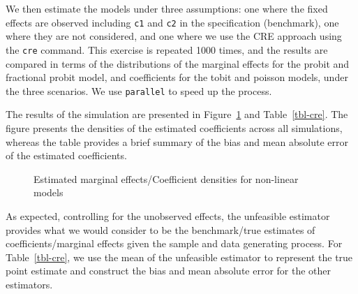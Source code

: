 \documentclass[bib]{statapress}
\begin{document}
We then estimate the models under three assumptions: one where the fixed
effects are observed including \texttt{c1} and \texttt{c2} in the
specification (benchmark), one where they are not considered, and one
where we use the CRE approach using the \texttt{cre} command. This
exercise is repeated 1000 times, and the results are compared in terms
of the distributions of the marginal effects for the probit and
fractional probit model, and coefficients for the tobit and poisson
models, under the three scenarios. We use
\texttt{parallel}\citep{vegayon2019} to speed up the process.

The results of the simulation are presented in Figure~\ref{fig-cre} and
Table~\ref{tbl-cre}. The figure presents the densities of the estimated
coefficients across all simulations, whereas the table provides a brief
summary of the bias and mean absolute error of the estimated
coefficients.

\begin{figure}[H]


\caption{\label{fig-cre}Estimated marginal effects/Coefficient densities
for non-linear models}

\end{figure}%

As expected, controlling for the unobserved effects, the unfeasible
estimator provides what we would consider to be the benchmark/true
estimates of coefficients/marginal effects given the sample and data
generating process. For Table~\ref{tbl-cre}, we use the mean of the
unfeasible estimator to represent the true point estimate and construct
the bias and mean absolute error for the other estimators.
\end{document}
